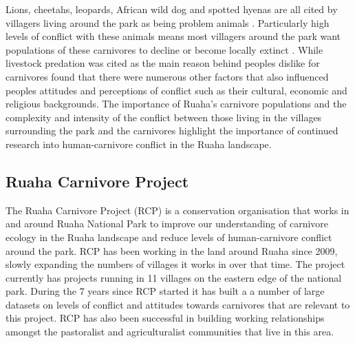 Lions, cheetahs, leopards, African wild dog and spotted hyenas are all cited by villagers living around the park as being problem animals \cite{Dickman2008}. Particularly high levels of conflict with these animals means most villagers around the park want populations of these carnivores to decline or become locally extinct \cite{Dickman2008}. While livestock predation was cited as the main reason behind peoples dislike for carnivores \citet{Dickman2008} found that there were numerous other factors that also influenced peoples attitudes and perceptions of conflict such as their cultural, economic and religious backgrounds. The importance of Ruaha's carnivore populations and the complexity and intensity of the conflict between those living in the villages surrounding the park and the carnivores highlight the importance of continued research into human-carnivore conflict in the Ruaha landscape.\\

\subsection{Ruaha Carnivore Project}

The Ruaha Carnivore Project (RCP) is a conservation organisation that works in and around Ruaha National Park to improve our understanding of carnivore ecology in the Ruaha landscape and reduce levels of human-carnivore conflict around the park. RCP has been working in the land around Ruaha since 2009, slowly expanding the numbers of villages it works in over that time. The project currently has projects running in 11 villages on the eastern edge of the national park. During the 7 years since RCP started it has built a a number of large datasets on levels of conflict and attitudes towards carnivores that are relevant to this project. RCP has also been successful in building working relationships amongst the pastoralist and agriculturalist communities that live in this area. \\